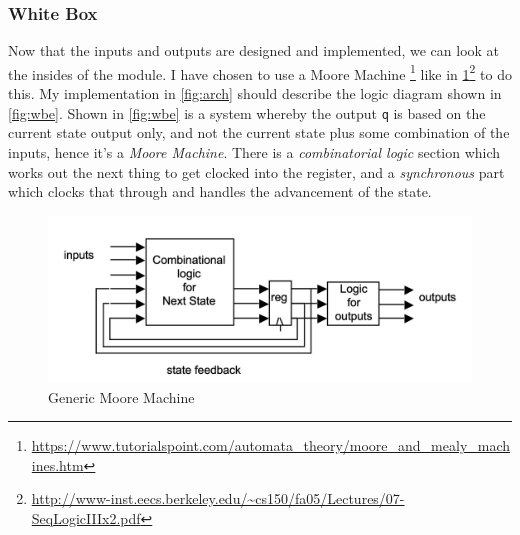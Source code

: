 \documentclass[11pt,a4paper]{article}
\begin{document}
\subsubsection{White Box}
Now that the inputs and outputs are designed and implemented, we can look at the insides of the module. I have chosen to use a Moore Machine \footnote{\url{https://www.tutorialspoint.com/automata_theory/moore_and_mealy_machines.htm}} like in \cref{fig:mm}\footnote{\url{http://www-inst.eecs.berkeley.edu/~cs150/fa05/Lectures/07-SeqLogicIIIx2.pdf}} to do this. My implementation in \cref{fig:arch} should describe the logic diagram shown in \cref{fig:wbe}. Shown in \cref{fig:wbe} is a system whereby the output \texttt{q} is based on the current state output only, and not the current state plus some combination of the inputs, hence it's a \emph{Moore Machine}. There is a \emph{combinatorial logic} section which works out the next thing to get clocked into the register, and a \emph{synchronous} part which clocks that through and handles the advancement of the state.

\begin{figure}
    \begin{center}
        \includegraphics[width=\textwidth]{./src/moore_machine.png}
    \end{center}
    \caption{Generic Moore Machine}
    \label{fig:mm}
\end{figure}

\end{document}
